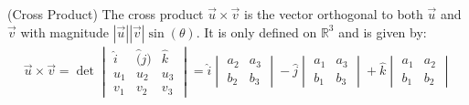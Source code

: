 \pagraph(Cross Product)
The cross product $\vec{u} \times \vec{v}$ is the vector orthogonal to both $\vec{u}$ and $\vec{v}$ with magnitude $|\vec{u}||\vec{v}|\sin(\theta)$. 
It is only defined on $\mathbb{R}^3$ and is given by:
\begin{align*}
\vec{u} \times \vec{v} = \det \begin{vmatrix}
    \hat{i} & \hat(j) & \hat{k} \\
    u_1 & u_2 & u_3 \\
    v_1 & v_2 & v_3
\end{vmatrix} = \hat{i} \begin{vmatrix}
    a_2 & a_3 \\
    b_2 & b_3
\end{vmatrix} - \hat{j} \begin{vmatrix}
    a_1 & a_3 \\
    b_1 & b_3
\end{vmatrix} + \hat{k} \begin{vmatrix}
    a_1 & a_2 \\
    b_1 & b_2
\end{vmatrix}
\end{align*}

